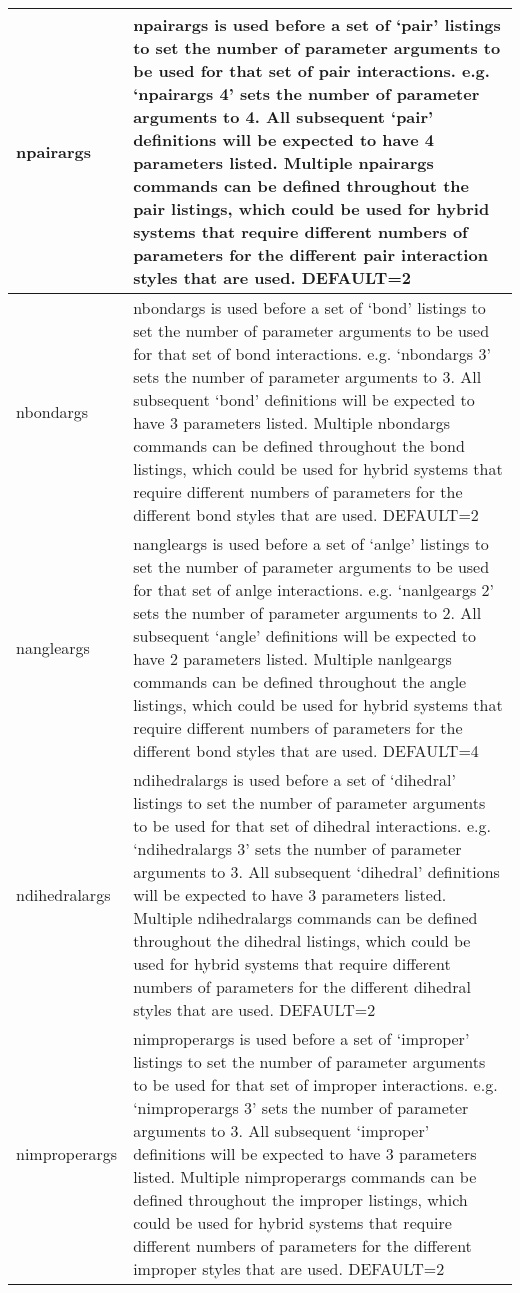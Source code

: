 \documentclass[12pt,letterpaper,]{article}
\begin{document}
\begin{table}[h!]
\centering
\begin{tabular}{|l | p{14cm} |}
\hline
npairargs & npairargs is used before a set of `pair' listings to set the number of parameter arguments to be used for that
set of pair interactions. e.g. `npairargs 4' sets the number of parameter arguments to 4. All subsequent `pair' definitions will be expected to have 4 parameters listed. Multiple npairargs commands can be defined throughout the pair listings, which could be used for hybrid systems that require different numbers of parameters for the different pair interaction styles that are used. DEFAULT=2 \\ \hline
nbondargs & nbondargs is used before a set of `bond' listings to set the number of parameter arguments to be used for that set of bond interactions. e.g. `nbondargs 3' sets the number of parameter arguments to 3. All subsequent `bond' definitions will be expected to have 3 parameters listed. Multiple nbondargs commands can be defined throughout the bond listings, which could be used for hybrid systems that require different numbers of parameters for the different bond styles that are used. DEFAULT=2 \\ \hline
nangleargs & nangleargs is used before a set of `anlge' listings to set the number of parameter arguments to be used for that set of anlge interactions. e.g. `nanlgeargs 2' sets the number of parameter arguments to 2. All subsequent `angle' definitions will be expected to have 2 parameters listed. Multiple nanlgeargs commands can be defined throughout the angle listings, which could be used for hybrid systems that require different numbers of parameters for the different bond styles that are used. DEFAULT=4\\ \hline
ndihedralargs & ndihedralargs is used before a set of `dihedral' listings to set the number of parameter arguments to be used for that set of dihedral interactions. e.g. `ndihedralargs 3' sets the number of parameter arguments to 3. All subsequent `dihedral' definitions will be expected to have 3 parameters listed. Multiple ndihedralargs commands can be defined throughout the dihedral listings, which could be used for hybrid systems that require different numbers of parameters for the different dihedral styles that are used. DEFAULT=2 \\ \hline
nimproperargs & nimproperargs is used before a set of `improper' listings to set the number of parameter arguments to be used for that set of improper interactions. e.g. `nimproperargs 3' sets the number of parameter arguments to 3. All subsequent `improper' definitions will be expected to have 3 parameters listed. Multiple nimproperargs commands can be defined throughout the improper listings, which could be used for hybrid systems that require different numbers of parameters for the different improper styles that are used. DEFAULT=2 \\ \hline
\end{tabular}
\end{table} 
\end{document}
